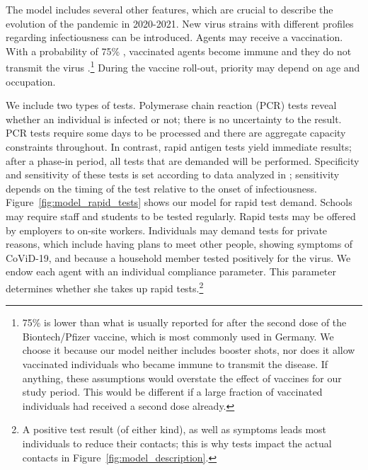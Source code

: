 The model includes several other features, which are crucial to describe the evolution
of the pandemic in 2020-2021. New virus strains with different profiles regarding
infectiousness can be introduced. Agents may receive a vaccination. With a probability
of 75\% \citep{Hunter2021}, vaccinated agents become immune and they do not transmit the
virus \citep{Petter2021, LevineTiefenbrun2021, Pritchard2021}.\footnote{75\% is lower
than what is usually reported for after the second dose of the Biontech/Pfizer vaccine,
which is most commonly used in Germany. We choose it because our model neither includes
booster shots, nor does it allow vaccinated individuals who became immune to transmit
the disease\citep{Petter2021, LevineTiefenbrun2021, Pritchard2021}. If anything, these
assumptions would overstate the effect of vaccines for our study period. This would be
different if a large fraction of vaccinated individuals had received a second dose
already.} During the vaccine roll-out, priority may depend on age and occupation.

We include two types of tests. Polymerase chain reaction (PCR) tests reveal whether an
individual is infected or not; there is no uncertainty to the result. PCR tests require
some days to be processed and there are aggregate capacity constraints throughout. In
contrast, rapid antigen tests yield immediate results; after a phase-in period, all tests
that are demanded will be performed. Specificity and sensitivity of these tests is set
according to data analyzed in \cite{Bruemmer2021, Smith2021}; sensitivity depends on the
timing of the test relative to the onset of infectiousness.
Figure~\ref{fig:model_rapid_tests} shows our model for rapid test demand. Schools may
require staff and students to be tested regularly. Rapid tests may be offered by
employers to on-site workers. Individuals may demand tests for private reasons, which
include having plans to meet other people, showing symptoms of CoViD-19, and because a
household member tested positively for the virus. We endow each agent with an individual
compliance parameter. This parameter determines whether she takes up rapid
tests.\footnote{A positive test result (of either kind), as well as symptoms leads most
individuals to reduce their contacts; this is why tests impact the actual contacts in
Figure~\ref{fig:model_description}.}

